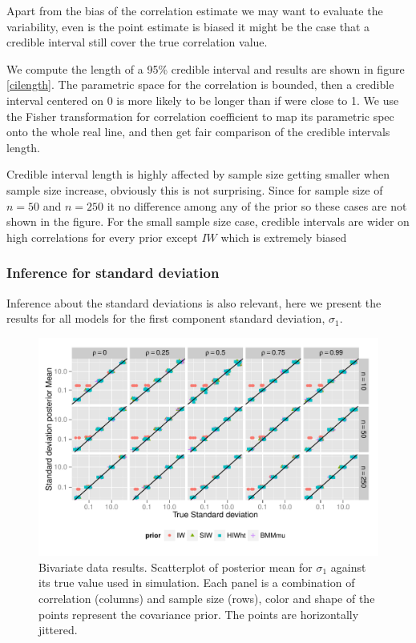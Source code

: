 \documentclass{article}
\begin{document}
Apart from the bias of the correlation estimate we may want to evaluate the variability, even is the point estimate is biased it might be the case that a credible interval still cover the true correlation value.  

We compute the length of a 95\% credible interval and results are shown in figure \ref{cilength}. The parametric space for the correlation is bounded, then a credible interval centered on 0 is more likely to be longer than if were close to 1. We use the Fisher transformation for correlation coefficient to  map its parametric spec onto the whole real line, and then get fair comparison of the credible intervals length. 

Credible interval length is highly affected by sample size getting smaller when sample size increase,  obviously this is not surprising. Since for sample size of $n=50$ and $n=250$ it no difference among any of the prior so these cases are not shown in the figure. For the small sample size case, credible intervals are wider on high correlations for every prior except $IW$ which is extremely biased

\subsubsection{Inference for standard deviation}
Inference about the standard deviations is also relevant, here we present the results for all models for the first component standard deviation, $\sigma_1$. 
\begin{figure}[htbp]
   \centering
   \includegraphics[width=\textwidth]{fig_s1_d2} 
    \vspace{-.5in}
   \caption{Bivariate data results. Scatterplot of posterior mean for $\sigma_1$  against its true value used in simulation. Each panel is a combination of correlation (columns) and sample size (rows),  color and shape of the points represent the covariance prior. The points are horizontally jittered. \label{devF1} }
\end{figure}
\end{document}
